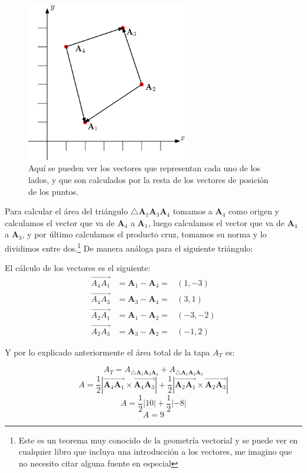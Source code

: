 \begin{figure}
 \centering
 \includegraphics[width=7cm]{Img/01/vectores_cuerpo}
 \caption[Cálculo del área de un caudrilátero]{ 
Aquí se pueden ver los vectores que representan cada uno de los lados, y que son calculados por la resta de los vectores de posición de los puntos.
 } \label{vectorArista:fig}
\end{figure}

Para calcular el área del triángulo $\bigtriangleup \textbf{A}_1 \textbf{A}_3 \textbf{A}_4$ tomamos a $\textbf{A}_4$ como origen y calculamos el vector que va de $\textbf{A}_4$ a $\textbf{A}_1$, luego calculamos el vector que va de $\textbf{A}_4$ a $\textbf{A}_3$, y por último calculamos el producto cruz, tomamos su norma y lo dividimos entre dos.\footnote{Este es un teorema muy conocido de la geometría vectorial y se puede ver en cualquier libro que incluya una introducción a los vectores, me imagino que no necesito citar alguna fuente en especial}
De manera análoga para el siguiente triángulo:

El cálculo de los vectores es el siguiente:
\begin{eqnarray}
\overrightarrow{A_4 A_1} & = \textbf{A}_1 - \textbf{A}_4 = & (1, -3) \nonumber \\
\overrightarrow{A_4 A_3} & = \textbf{A}_3 - \textbf{A}_4 = & (3, 1) \nonumber \\
\overrightarrow{A_2 A_1} & = \textbf{A}_1 - \textbf{A}_2 = & (-3, -2) \nonumber \\
\overrightarrow{A_2 A_3} & = \textbf{A}_3 - \textbf{A}_2 = & (-1, 2) \nonumber
\end{eqnarray}

Y por lo explicado anteriormente el área total de la tapa $A_T$ es:

$$ A_T = A_{\bigtriangleup \textbf{A}_1 \textbf{A}_3 \textbf{A}_4} + A_{\bigtriangleup \textbf{A}_1 \textbf{A}_2 \textbf{A}_3} $$
$$ A = \frac{1}{2} | \overrightarrow{\textbf{A}_4 \textbf{A}_1} \times \overrightarrow{\textbf{A}_4 \textbf{A}_3} | + \frac{1}{2} | \overrightarrow{\textbf{A}_2 \textbf{A}_1} \times \overrightarrow{\textbf{A}_2 \textbf{A}_3} |$$
$$A = \frac{1}{2} | 10 | + \frac{1}{2} | -8 |$$
$$A = 9$$

